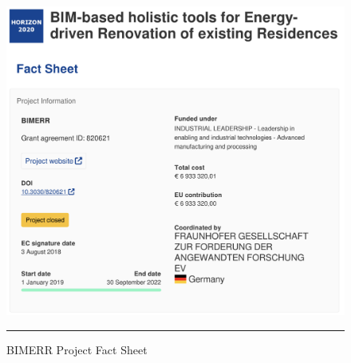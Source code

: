 \begin{figure}[htbp]
    \centering
 \includegraphics[width=.9\textwidth]{figures/scenario-analysis/bimerr-fact-sheet.png}
     \rule{35em}{0.5pt}
    \caption{BIMERR Project Fact Sheet}
 \label{fig:bimerr-fact-sheet}
\end{figure}

